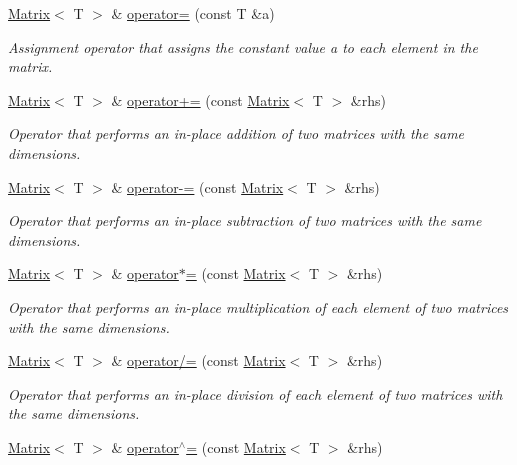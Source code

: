 \begin{DoxyCompactItemize}
\mbox{\hyperlink{classMatrix}{Matrix}}$<$ T $>$ \& \mbox{\hyperlink{classMatrix_a603960a94121d9b35509199de88d1a92}{operator=}} (const T \&a)
\begin{DoxyCompactList}\small\item\em Assignment operator that assigns the constant value {\ttfamily a} to each element in the matrix. \end{DoxyCompactList}\item 
\mbox{\hyperlink{classMatrix}{Matrix}}$<$ T $>$ \& \mbox{\hyperlink{classMatrix_a36fdb87d0aa1b906eda9fa1cf81a1477}{operator+=}} (const \mbox{\hyperlink{classMatrix}{Matrix}}$<$ T $>$ \&rhs)
\begin{DoxyCompactList}\small\item\em Operator that performs an in-\/place addition of two matrices with the same dimensions. \end{DoxyCompactList}\item 
\mbox{\hyperlink{classMatrix}{Matrix}}$<$ T $>$ \& \mbox{\hyperlink{classMatrix_a50e2998bc90012d77efc0ff39d089336}{operator-\/=}} (const \mbox{\hyperlink{classMatrix}{Matrix}}$<$ T $>$ \&rhs)
\begin{DoxyCompactList}\small\item\em Operator that performs an in-\/place subtraction of two matrices with the same dimensions. \end{DoxyCompactList}\item 
\mbox{\hyperlink{classMatrix}{Matrix}}$<$ T $>$ \& \mbox{\hyperlink{classMatrix_af6a95588910fa9c53feaae71fe88df81}{operator$\ast$=}} (const \mbox{\hyperlink{classMatrix}{Matrix}}$<$ T $>$ \&rhs)
\begin{DoxyCompactList}\small\item\em Operator that performs an in-\/place multiplication of each element of two matrices with the same dimensions. \end{DoxyCompactList}\item 
\mbox{\hyperlink{classMatrix}{Matrix}}$<$ T $>$ \& \mbox{\hyperlink{classMatrix_aab1b305350c7547ee31f0eeb92fc8c4a}{operator/=}} (const \mbox{\hyperlink{classMatrix}{Matrix}}$<$ T $>$ \&rhs)
\begin{DoxyCompactList}\small\item\em Operator that performs an in-\/place division of each element of two matrices with the same dimensions. \end{DoxyCompactList}\item 
\mbox{\hyperlink{classMatrix}{Matrix}}$<$ T $>$ \& \mbox{\hyperlink{classMatrix_acf14abe2000a4a41dae10db14b5d039c}{operator$^\wedge$=}} (const \mbox{\hyperlink{classMatrix}{Matrix}}$<$ T $>$ \&rhs)

\end{DoxyCompactItemize}
